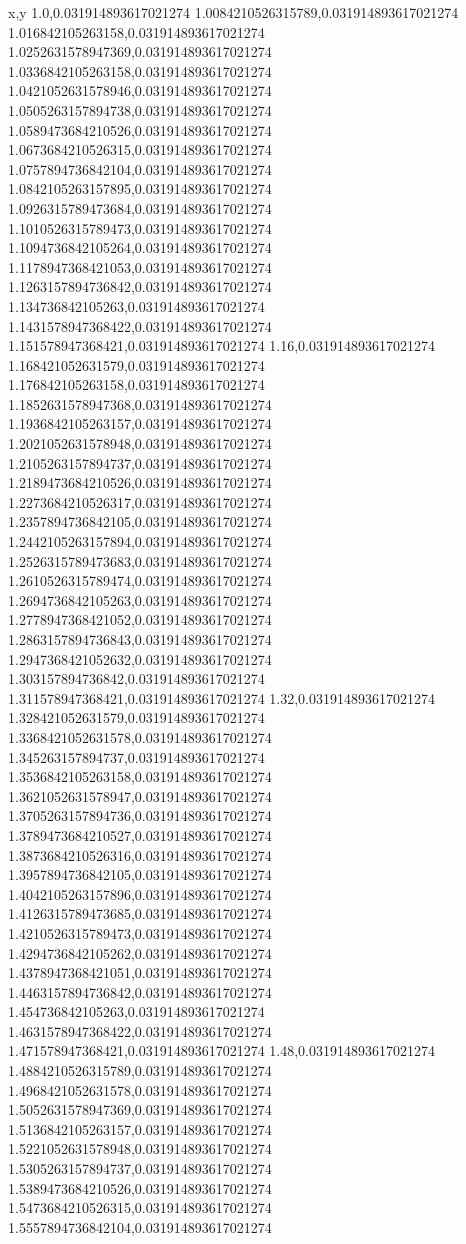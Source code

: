 x,y
1.0,0.031914893617021274
1.0084210526315789,0.031914893617021274
1.016842105263158,0.031914893617021274
1.0252631578947369,0.031914893617021274
1.0336842105263158,0.031914893617021274
1.0421052631578946,0.031914893617021274
1.0505263157894738,0.031914893617021274
1.0589473684210526,0.031914893617021274
1.0673684210526315,0.031914893617021274
1.0757894736842104,0.031914893617021274
1.0842105263157895,0.031914893617021274
1.0926315789473684,0.031914893617021274
1.1010526315789473,0.031914893617021274
1.1094736842105264,0.031914893617021274
1.1178947368421053,0.031914893617021274
1.1263157894736842,0.031914893617021274
1.134736842105263,0.031914893617021274
1.1431578947368422,0.031914893617021274
1.151578947368421,0.031914893617021274
1.16,0.031914893617021274
1.168421052631579,0.031914893617021274
1.176842105263158,0.031914893617021274
1.1852631578947368,0.031914893617021274
1.1936842105263157,0.031914893617021274
1.2021052631578948,0.031914893617021274
1.2105263157894737,0.031914893617021274
1.2189473684210526,0.031914893617021274
1.2273684210526317,0.031914893617021274
1.2357894736842105,0.031914893617021274
1.2442105263157894,0.031914893617021274
1.2526315789473683,0.031914893617021274
1.2610526315789474,0.031914893617021274
1.2694736842105263,0.031914893617021274
1.2778947368421052,0.031914893617021274
1.2863157894736843,0.031914893617021274
1.2947368421052632,0.031914893617021274
1.303157894736842,0.031914893617021274
1.311578947368421,0.031914893617021274
1.32,0.031914893617021274
1.328421052631579,0.031914893617021274
1.3368421052631578,0.031914893617021274
1.345263157894737,0.031914893617021274
1.3536842105263158,0.031914893617021274
1.3621052631578947,0.031914893617021274
1.3705263157894736,0.031914893617021274
1.3789473684210527,0.031914893617021274
1.3873684210526316,0.031914893617021274
1.3957894736842105,0.031914893617021274
1.4042105263157896,0.031914893617021274
1.4126315789473685,0.031914893617021274
1.4210526315789473,0.031914893617021274
1.4294736842105262,0.031914893617021274
1.4378947368421051,0.031914893617021274
1.4463157894736842,0.031914893617021274
1.454736842105263,0.031914893617021274
1.4631578947368422,0.031914893617021274
1.471578947368421,0.031914893617021274
1.48,0.031914893617021274
1.4884210526315789,0.031914893617021274
1.4968421052631578,0.031914893617021274
1.5052631578947369,0.031914893617021274
1.5136842105263157,0.031914893617021274
1.5221052631578948,0.031914893617021274
1.5305263157894737,0.031914893617021274
1.5389473684210526,0.031914893617021274
1.5473684210526315,0.031914893617021274
1.5557894736842104,0.031914893617021274
